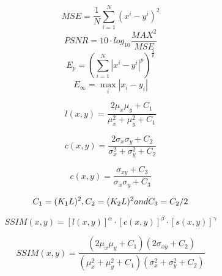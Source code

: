 \begin{equation}
MSE= \frac{1}{N} \sum_{i=1}^N{(x^i-y^i)^2}
\end{equation}
\begin{equation}
PSNR= 10 \cdot log_{10}\frac{MAX^2}{MSE}
\end{equation}
\begin{equation}
E_p = ( \sum_{i=1}^N{|x^i-y^i|^p})^{\frac{1}{p}}
\end{equation}
\begin{equation}
E_\infty = \max_i{|x_i-y_i|}
\end{equation}

\begin{equation}
l(x, y) = \frac{2\mu_x \mu_y + C_1}{\mu_x^2 + \mu_y^2 + C_1}
\end{equation}

\begin{equation}
c(x, y) = \frac{2\sigma_x \sigma_y + C_2}{\sigma_x^2 + \sigma_y^2 + C_2}
\end{equation}

\begin{equation}
c(x, y) = \frac{\sigma_{xy} + C_3}{\sigma_x \sigma_y + C_3}
\end{equation}

\begin{equation}
C_1 = (K_1 L)^2, C_2 = (K_2 L)^2 \space and \space C_3 = C_2/2
\end{equation}

\begin{equation}
SSIM(x, y) = [l(x, y)]^\alpha \cdot[c(x, y)]^\beta \cdot[s(x, y)]^\gamma
\end{equation} 

\begin{equation}
SSIM(x, y) = \frac{(2\mu_x \mu_y + C_1)(2\sigma_{xy} + C_2)}{(\mu_x^2 + \mu_y^2 + C_1)(\sigma_x^2 + \sigma_y^2 + C_2)}
\end{equation} 